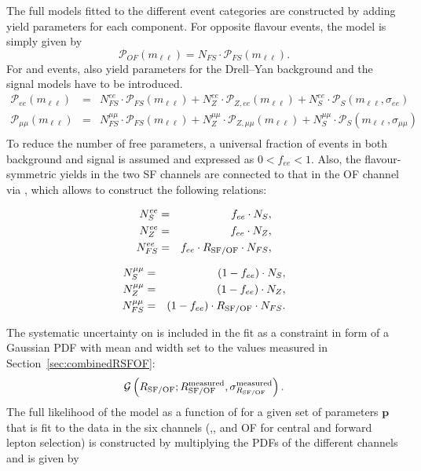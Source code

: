 The full models fitted to the different event categories are constructed by adding yield parameters for each component. For opposite flavour events, the model is simply given by 
\begin{equation*}
 \mathcal{P}_{OF}(m_{\ell\ell}) = N_{FS} \cdot \mathcal{P}_{FS}(m_{\ell\ell}).
\end{equation*}
For \EE and \MM events, also yield parameters for the Drell--Yan background and the signal models have to be introduced. 
\begin{eqnarray*}
 {\mathcal{P}}_{ee}(m_{\ell\ell})     & = &  N_{FS}^{ee} \cdot {\mathcal{P}}_{FS}(m_{\ell\ell})      +  N_{Z}^{ee} \cdot {\mathcal{P}}_{Z,ee}(m_{\ell\ell})           +   N_{S}^{ee} \cdot  {\mathcal{P}}_{S}(m_{\ell\ell},\sigma_{ee}) \\
 {\mathcal{P}}_{\mu\mu}(m_{\ell\ell}) & = &   N_{FS}^{\mu\mu} \cdot {\mathcal{P}}_{FS}(m_{\ell\ell})  +  N_{Z}^{\mu\mu} \cdot {\mathcal{P}}_{Z,\mu\mu}(m_{\ell\ell})   +   N_{S}^{\mu\mu} \cdot {\mathcal{P}}_{S}(m_{\ell\ell},\sigma_{\mu\mu}) \\
\end{eqnarray*}
To reduce the number of free parameters, a universal fraction of \EE events in both background and signal is assumed and expressed as $0 < f_{ee} < 1$. Also, the flavour-symmetric yields in the two SF channels are connected to that in the OF channel via \Rsfof, which allows to construct the following relations:
\begin{center}
  \begin{minipage}[t]{0.49\textwidth}
\begin{eqnarray*}
 N_{S}^{ee} &=& f_{ee} \cdot N_{S}, \\
  N_{Z}^{ee} &=& f_{ee} \cdot N_{Z},\\
    N_{FS}^{ee} &=& f_{ee} \cdot R_{\text{SF/OF}} \cdot N_{FS}, \\
\end{eqnarray*}
  \end{minipage}
  \begin{minipage}[t]{0.49\textwidth}
\begin{eqnarray*}
 N_{S}^{\mu\mu} &=& (1-f_{ee}) \cdot N_{S}, \\
  N_{Z}^{\mu\mu} &=& (1-f_{ee}) \cdot N_{Z}, \\
    N_{FS}^{\mu\mu} &=& (1-f_{ee}) \cdot R_{\text{SF/OF}} \cdot N_{FS}. \\
\end{eqnarray*}
  \end{minipage}
\end{center}
The systematic uncertainty on \Rsfof is included in the fit as a constraint in form of a Gaussian PDF with mean and width set to the values measured in Section~\ref{sec:combinedRSFOF}:
\begin{equation*}
{\mathcal{G}}\left(R_{\text{SF/OF}};R_{\text{SF/OF}}^{\text{measured}},\sigma_{R_{\text{SF/OF}}}^{\text{measured}}\right).
\end{equation*}
The full likelihood of the model as a function of \mll for a given set of parameters $\mathbf{p}$ that is fit to the data in the six channels (\EE,\MM, and OF for central and forward lepton selection) is constructed by multiplying the PDFs of the different channels and is given by

